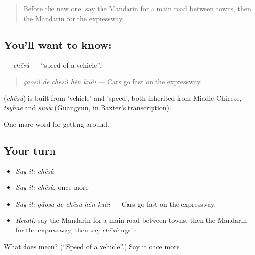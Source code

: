 \label{lesson:ZH-C421-chesu}



\begin{quote}
Before the new one: say the Mandarin for a main road between towns, then the Mandarin for the expressway.
\end{quote}

\subsection*{You'll want to know: }
\textbf{} — \emph{chēsù} — \textquotedblleft{}speed of a vehicle\textquotedblright{}.

\begin{quote}
\textbf{} \emph{gāosù de chēsù hěn kuài} — Cars go fast on the expressway.
\end{quote}

\begin{cousinweb}
\textbf{} (\emph{chēsù}) is built from  'vehicle' and  'speed', both inherited from Middle Chinese, \emph{tsyhae} and \emph{suwk} (Guangyun, in Baxter's transcription).
\end{cousinweb}

\begin{grammarlens}[title={What you've built}]
One more word for getting around.
\end{grammarlens}

\subsection*{Your turn}
\begin{itemize}
\raggedright
  \item \emph{Say it:} \emph{chēsù}
  \item \emph{Say it:} \emph{chēsù}, once more
  \item \emph{Say it:} \emph{gāosù de chēsù hěn kuài} — Cars go fast on the expressway.
  \item \emph{Recall:} say the Mandarin for a main road between towns, then the Mandarin for the expressway, then say \emph{chēsù} again
\end{itemize}

\begin{tcolorbox}[breakable,colback=teal!4,colframe=teal!35!black,title={Before you move on}]
What does  mean? (\textquotedblleft{}Speed of a vehicle\textquotedblright{}.) Say it once more.
\end{tcolorbox}
